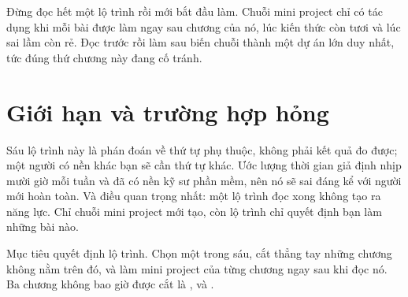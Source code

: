 \documentclass[../../deep_learning.tex]{subfiles}
\begin{document}
\begin{cambay}
Đừng đọc hết một lộ trình rồi mới bắt đầu làm. Chuỗi mini project chỉ có tác dụng khi mỗi bài được làm ngay sau chương của nó, lúc kiến thức còn tươi và lúc sai lầm còn rẻ. Đọc trước rồi làm sau biến chuỗi thành một dự án lớn duy nhất, tức đúng thứ chương này đang cố tránh.
\end{cambay}

\section{Giới hạn và trường hợp hỏng}

Sáu lộ trình này là phán đoán về thứ tự phụ thuộc, không phải kết quả đo được; một người có nền khác bạn sẽ cần thứ tự khác. Ước lượng thời gian giả định nhịp mười giờ mỗi tuần và đã có nền kỹ sư phần mềm, nên nó sẽ sai đáng kể với người mới hoàn toàn. Và điều quan trọng nhất: một lộ trình đọc xong không tạo ra năng lực. Chỉ chuỗi mini project mới tạo, còn lộ trình chỉ quyết định bạn làm những bài nào.

\begin{cannho}
Mục tiêu quyết định lộ trình. Chọn một trong sáu, cắt thẳng tay những chương không nằm trên đó, và làm mini project của từng chương ngay sau khi đọc nó. Ba chương không bao giờ được cắt là ,  và .
\end{cannho}
\end{document}
